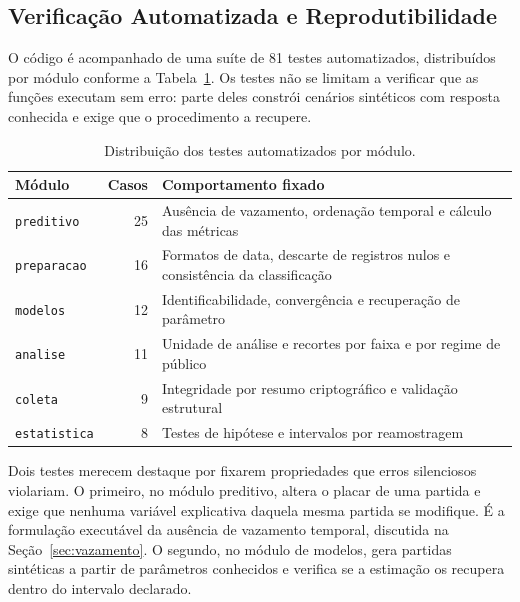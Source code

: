 \subsection{Verificação Automatizada e Reprodutibilidade}\label{sec:verificacao}

O código é acompanhado de uma suíte de 81 testes automatizados, distribuídos por
módulo conforme a Tabela~\ref{tab:testes-automatizados}. Os testes não se limitam a verificar
que as funções executam sem erro: parte deles constrói cenários sintéticos com
resposta conhecida e exige que o procedimento a recupere.

\begin{table}[htb]
  \centering
  \caption{Distribuição dos testes automatizados por módulo.}
  \label{tab:testes-automatizados}
  \small
  \begin{tabular}{@{}lrp{6.6cm}@{}}
    \toprule
    \textbf{Módulo} & \textbf{Casos} & \textbf{Comportamento fixado} \\
    \midrule
    \texttt{preditivo}   & 25 & Ausência de vazamento, ordenação temporal e
                                cálculo das métricas \\
    \texttt{preparacao}  & 16 & Formatos de data, descarte de registros nulos e
                                consistência da classificação \\
    \texttt{modelos}     & 12 & Identificabilidade, convergência e recuperação de
                                parâmetro \\
    \texttt{analise}     & 11 & Unidade de análise e recortes por faixa e por
                                regime de público \\
    \texttt{coleta}      &  9 & Integridade por resumo criptográfico e
                                validação estrutural \\
    \texttt{estatistica} &  8 & Testes de hipótese e intervalos por
                                reamostragem \\
    \bottomrule
  \end{tabular}
\end{table}

Dois testes merecem destaque por fixarem propriedades que erros silenciosos
violariam. O primeiro, no módulo preditivo, altera o placar de uma partida e
exige que nenhuma variável explicativa daquela mesma partida se modifique. É a
formulação executável da ausência de vazamento temporal, discutida na
Seção~\ref{sec:vazamento}. O segundo, no módulo de modelos, gera partidas
sintéticas a partir de parâmetros conhecidos e verifica se a estimação os
recupera dentro do intervalo declarado.

